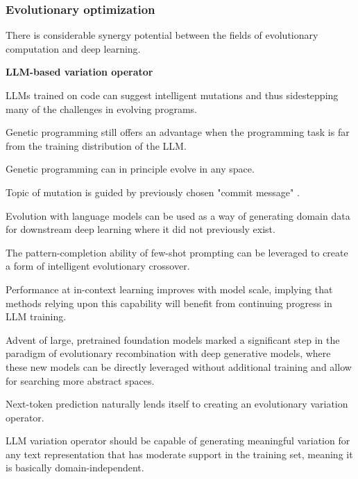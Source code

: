 \subsubsection{Evolutionary optimization}
There is considerable synergy potential between the fields of evolutionary computation and deep learning. \cite{lehman2022evolutionlargemodels}

\textbf{LLM-based variation operator}



LLMs trained on code can suggest intelligent mutations and thus sidestepping many of the challenges in evolving programs. \cite{lehman2022evolutionlargemodels}

Genetic programming still offers an advantage when the programming task is far from the training distribution of the LLM. \cite{lehman2022evolutionlargemodels}

Genetic programming can in principle evolve in any space. \cite{lehman2022evolutionlargemodels}

Topic of mutation is guided by previously chosen "commit message" . \cite{lehman2022evolutionlargemodels}

Evolution with language models can be used as a way of generating domain data for downstream deep learning where it did not previously exist. \cite{lehman2022evolutionlargemodels}


The pattern-completion ability of few-shot prompting can be leveraged to create a form of intelligent evolutionary crossover. \cite{meyerson2024languagemodelcrossovervariation}

Performance at in-context learning improves with model scale, implying that methods relying upon this capability will benefit from continuing progress in LLM training. \cite{meyerson2024languagemodelcrossovervariation}

Advent of large, pretrained foundation models marked a significant step in the paradigm of evolutionary recombination with deep generative models, where these new models can be directly leveraged without additional training and allow for searching more abstract spaces. \cite{meyerson2024languagemodelcrossovervariation}

Next-token prediction naturally lends itself to creating an evolutionary variation operator. \cite{meyerson2024languagemodelcrossovervariation}

LLM variation operator should be capable of generating meaningful variation for any text representation that has moderate support in the training set, meaning it is basically domain-independent. \cite{meyerson2024languagemodelcrossovervariation}

